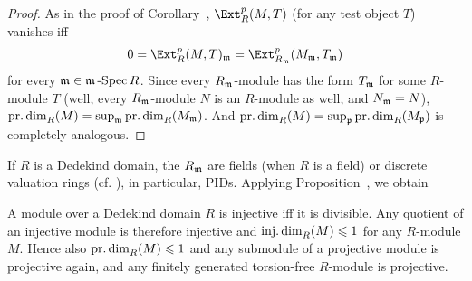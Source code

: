 \documentclass[a4paper,parskip=half,numbers=enddot, DIV=12]{scrreprt}
\renewcommand{\leq}{\leqslant}
\begin{document}
\begin{proof}
	As in the proof of Corollary~, $\Ext_R^p(M,T)$ (for any test object $T$) vanishes iff
	\begin{align*}
		0=\Ext_R^p(M,T)_\mm=\Ext_{R_\mm}^p(M_\mm,T_\mm)
	\end{align*}
	for every $\mathfrak{m}\in\mathfrak{m}\operatorname{-Spec} R$. Since every $R_{\mathfrak{m}}$-module has the form $T_{\mathfrak{m}}$ for some $R$-module $T$ (well, every $R_{\mathfrak{m}}$-module $N$ is an $R$-module as well, and $N_{\mathfrak{m}}=N$), $\operatorname{pr.dim}_R(M)=\sup_{\mathfrak{m}}\operatorname{pr.dim}_R(M_{\mathfrak{m}})$. And $\operatorname{pr.dim}_R(M)=\sup_{\mathfrak{p}}\operatorname{pr.dim}_R(M_{\mathfrak{p}})$ is completely analogous.
\end{proof}
If $R$ is a Dedekind domain, the $R_{\mathfrak{m}}$ are fields (when $R$ is a field) or discrete valuation rings (cf. \cite[Theorem~22]{alg2}), in particular, PIDs. Applying Proposition~, we obtain
\begin{cor}
	A module over a Dedekind domain $R$ is injective iff it is divisible. Any quotient of an injective module is therefore injective and $\idim_R(M)\leq 1$ for any $R$-module $M$. Hence also $\pdim_R(M)\leq 1$ and any submodule of a projective module is projective again, and any finitely generated torsion-free $R$-module is projective.
\end{cor}
\end{document}
